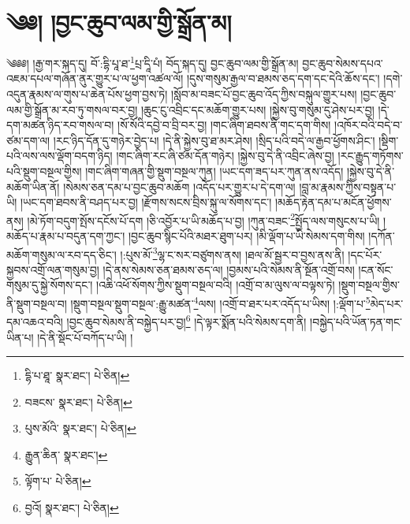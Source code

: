 \setcounter{footnote}{0} 
\chapter{༄༅། །བྱང་ཆུབ་ལམ་གྱི་སྒྲོན་མ།}༄༅༅། །རྒྱ་གར་སྐད་དུ། བོ་:དྷི་པཱ་ཐ་\footnote{དྷི་པ་ཐཱ་  སྣར་ཐང་།  པེ་ཅིན། }པྲ་དཱི་པཾ། བོད་སྐད་དུ། བྱང་ཆུབ་ལམ་གྱི་སྒྲོན་མ། བྱང་ཆུབ་སེམས་དཔའ་འཇམ་དཔལ་གཞོན་ནུར་གྱུར་པ་ལ་ཕྱག་འཚལ་ལོ། །དུས་གསུམ་རྒྱལ་བ་ཐམས་ཅད་དག་དང་དེའི་ཆོས་དང་། །དགེ་འདུན་རྣམས་ལ་གུས་པ་ཆེན་པོས་ཕྱག་བྱས་ཏེ། །སློབ་མ་བཟང་པོ་བྱང་ཆུབ་འོད་ཀྱིས་བསྐུལ་གྱུར་པས། །བྱང་ཆུབ་ལམ་གྱི་སྒྲོན་མ་རབ་ཏུ་གསལ་བར་བྱ། །ཆུང་ངུ་འབྲིང་དང་མཆོག་གྱུར་པས། །སྐྱེས་བུ་གསུམ་དུ་ཤེས་པར་བྱ། །དེ་དག་མཚན་ཉིད་རབ་གསལ་བ། །སོ་སོའི་དབྱེ་བ་བྲི་བར་བྱ། །གང་ཞིག་ཐབས་ནི་གང་དག་གིས། །འཁོར་བའི་བདེ་བ་ཙམ་དག་ལ། །རང་ཉིད་དོན་དུ་གཉེར་བྱེད་པ། །དེ་ནི་སྐྱེས་བུ་ཐ་མར་ཤེས། །སྲིད་པའི་བདེ་ལ་རྒྱབ་ཕྱོགས་ཤིང་། །སྡིག་པའི་ལས་ལས་ལྡོག་བདག་ཉིད། །གང་ཞིག་རང་ཞི་ཙམ་དོན་གཉེར། །སྐྱེས་བུ་དེ་ནི་འབྲིང་ཞེས་བྱ། །རང་རྒྱུད་གཏོགས་པའི་སྡུག་བསྔལ་གྱིས། །གང་ཞིག་གཞན་གྱི་སྡུག་བསྔལ་ཀུན། །ཡང་དག་ཟད་པར་ཀུན་ནས་འདོད། །སྐྱེས་བུ་དེ་ནི་མཆོག་ཡིན་ནོ། །སེམས་ཅན་དམ་པ་བྱང་ཆུབ་མཆོག །འདོད་པར་གྱུར་པ་དེ་དག་ལ། །བླ་མ་རྣམས་ཀྱིས་བསྟན་པ་ཡི། །ཡང་དག་ཐབས་ནི་བཤད་པར་བྱ། །རྫོགས་སངས་བྲིས་སྐུ་ལ་སོགས་དང་། །མཆོད་རྟེན་དམ་པ་མངོན་ཕྱོགས་ནས། །མེ་ཏོག་བདུག་སྤོས་དངོས་པོ་དག །ཅི་འབྱོར་པ་ཡི་མཆོད་པ་བྱ། །ཀུན་བཟང་\footnote{བཟངས་  སྣར་ཐང་།  པེ་ཅིན། }སྤྱོད་ལས་གསུངས་པ་ཡི། །མཆོད་པ་རྣམ་པ་བདུན་དག་ཀྱང་། །བྱང་ཆུབ་སྙིང་པོའི་མཐར་ཐུག་པར། །མི་ལྡོག་པ་ཡི་སེམས་དག་གིས། །དཀོན་མཆོག་གསུམ་ལ་རབ་དད་ཅིང་། །:པུས་མོ་\footnote{པུས་མོའི་  སྣར་ཐང་།  པེ་ཅིན། }ལྷ་ང་སར་བཙུགས་ནས། །ཐལ་མོ་སྦྱར་བ་བྱས་ནས་ནི། །དང་པོར་སྐྱབས་འགྲོ་ལན་གསུམ་བྱ། །དེ་ནས་སེམས་ཅན་ཐམས་ཅད་ལ། །བྱམས་པའི་སེམས་ནི་སྔོན་འགྲོ་བས། །ངན་སོང་གསུམ་དུ་སྐྱེ་སོགས་དང་། །འཆི་འཕོ་སོགས་ཀྱིས་སྡུག་བསྔལ་བའི། །འགྲོ་བ་མ་ལུས་ལ་བལྟས་ཏེ། །སྡུག་བསྔལ་གྱིས་ནི་སྡུག་བསྔལ་བ། །སྡུག་བསྔལ་སྡུག་བསྔལ་:རྒྱུ་མཚན་\footnote{རྒྱུན་ཆིན་  སྣར་ཐང་། }ལས། །འགྲོ་བ་ཐར་པར་འདོད་པ་ཡིས། །:ལྡོག་པ་\footnote{ལྟོག་པ་  པེ་ཅིན། }མེད་པར་དམ་འཆའ་བའི། །བྱང་ཆུབ་སེམས་ནི་བསྐྱེད་པར་བྱ།\footnote{བྱའོ།  སྣར་ཐང་།  པེ་ཅིན། } །དེ་ལྟར་སྨོན་པའི་སེམས་དག་ནི། །བསྐྱེད་པའི་ཡོན་ཏན་གང་ཡིན་པ། །དེ་ནི་སྡོང་པོ་བཀོད་པ་ཡི། །
